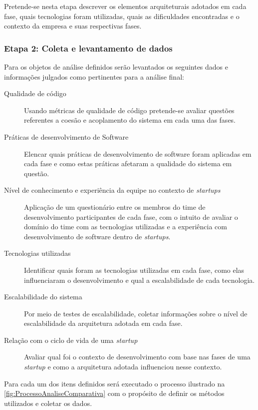 Pretende-se nesta etapa descrever os elementos arquiteturais adotados em cada fase,
quais tecnologias foram utilizadas, quais as dificuldades encontradas e o contexto
da empresa e suas respectivas fases.

\subsubsection{Etapa 2: Coleta e levantamento de dados}
\label{sec:Etapa2}

Para os objetos de análise definidos serão levantados os seguintes dados e informações
julgados como pertinentes para a análise final:

    \begin{description}
        \item [Qualidade de código] Usando métricas de qualidade de código pretende-se
        avaliar questões referentes a coesão e acoplamento do sistema em cada uma das
        fases.
        \item [Práticas de desenvolvimento de Software] Elencar quais práticas de
        desenvolvimento de software foram aplicadas em cada fase e como estas práticas
        afetaram a qualidade do sistema em questão.
        \item [Nível de conhecimento e experiência da equipe no contexto de \textit{startups}]
        Aplicação de um questionário entre os membros do time de desenvolvimento participantes
        de cada fase, com o intuito de avaliar o domínio do time com as tecnologias utilizadas
        e a experiência com desenvolvimento de software dentro de \textit{startups}.
        \item [Tecnologias utilizadas] Identificar quais foram as tecnologias utilizadas em
        cada fase, como elas influenciaram o desenvolvimento e qual a escalabilidade de cada
        tecnologia.
        \item [Escalabilidade do sistema] Por meio de testes de escalabilidade, coletar
        informações sobre o nível de escalabilidade da arquitetura adotada em cada fase.
        \item [Relação com o ciclo de vida de uma \textit{startup}] Avaliar qual foi o
        contexto de desenvolvimento com base nas fases de uma \textit{startup} e como a
        arquitetura adotada influenciou nesse contexto.
    \end{description}

Para cada um dos itens definidos será executado o processo ilustrado na
\autoref{fig:ProcessoAnaliseComparativa} com o propósito de definir os métodos utilizados
e coletar os dados.

